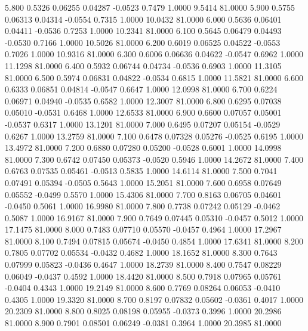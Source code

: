    5.800   0.5326   0.06255   0.04287  -0.0523   0.7479   1.0000   9.5414  81.0000
   5.900   0.5755   0.06313   0.04314  -0.0554   0.7315   1.0000  10.0432  81.0000
   6.000   0.5636   0.06401   0.04411  -0.0536   0.7253   1.0000  10.2341  81.0000
   6.100   0.5645   0.06479   0.04493  -0.0530   0.7166   1.0000  10.5026  81.0000
   6.200   0.6019   0.06525   0.04522  -0.0553   0.7026   1.0000  10.9316  81.0000
   6.300   0.6006   0.06636   0.04622  -0.0547   0.6962   1.0000  11.1298  81.0000
   6.400   0.5932   0.06744   0.04734  -0.0536   0.6903   1.0000  11.3105  81.0000
   6.500   0.5974   0.06831   0.04822  -0.0534   0.6815   1.0000  11.5821  81.0000
   6.600   0.6333   0.06851   0.04814  -0.0547   0.6647   1.0000  12.0998  81.0000
   6.700   0.6224   0.06971   0.04940  -0.0535   0.6582   1.0000  12.3007  81.0000
   6.800   0.6295   0.07038   0.05010  -0.0531   0.6468   1.0000  12.6533  81.0000
   6.900   0.6600   0.07057   0.05001  -0.0537   0.6317   1.0000  13.1201  81.0000
   7.000   0.6495   0.07207   0.05154  -0.0529   0.6267   1.0000  13.2759  81.0000
   7.100   0.6478   0.07328   0.05276  -0.0525   0.6195   1.0000  13.4972  81.0000
   7.200   0.6880   0.07280   0.05200  -0.0528   0.6001   1.0000  14.0998  81.0000
   7.300   0.6742   0.07450   0.05373  -0.0520   0.5946   1.0000  14.2672  81.0000
   7.400   0.6763   0.07535   0.05461  -0.0513   0.5835   1.0000  14.6114  81.0000
   7.500   0.7041   0.07491   0.05394  -0.0505   0.5643   1.0000  15.2051  81.0000
   7.600   0.6958   0.07649   0.05552  -0.0499   0.5570   1.0000  15.4306  81.0000
   7.700   0.8163   0.06705   0.04601  -0.0450   0.5061   1.0000  16.9980  81.0000
   7.800   0.7738   0.07242   0.05129  -0.0462   0.5087   1.0000  16.9167  81.0000
   7.900   0.7649   0.07445   0.05310  -0.0457   0.5012   1.0000  17.1475  81.0000
   8.000   0.7483   0.07710   0.05570  -0.0457   0.4964   1.0000  17.2967  81.0000
   8.100   0.7494   0.07815   0.05674  -0.0450   0.4854   1.0000  17.6341  81.0000
   8.200   0.7805   0.07702   0.05534  -0.0432   0.4682   1.0000  18.1652  81.0000
   8.300   0.7643   0.07999   0.05823  -0.0436   0.4647   1.0000  18.2739  81.0000
   8.400   0.7547   0.08229   0.06049  -0.0437   0.4592   1.0000  18.4420  81.0000
   8.500   0.7918   0.07965   0.05761  -0.0404   0.4343   1.0000  19.2149  81.0000
   8.600   0.7769   0.08264   0.06053  -0.0410   0.4305   1.0000  19.3320  81.0000
   8.700   0.8197   0.07832   0.05602  -0.0361   0.4017   1.0000  20.2309  81.0000
   8.800   0.8025   0.08198   0.05955  -0.0373   0.3996   1.0000  20.2986  81.0000
   8.900   0.7901   0.08501   0.06249  -0.0381   0.3964   1.0000  20.3985  81.0000
